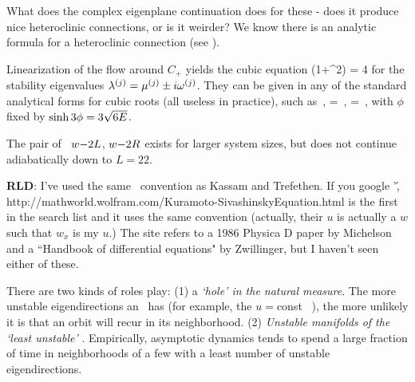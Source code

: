 {What does the complex eigenplane continuation does for these
{\eqva} - does it produce nice heteroclinic connections, or is it
weirder? We know there is an analytic formula for a heteroclinic
connection (see ). %

Linearization of the flow around $C_{+}$ yields the cubic equation
  \beq
\eigExp(1+\eigExp^2) = 4 \expctE
for the
stability eigenvalues
$\eigExp[j] = \eigRe[j] \pm i \eigIm[j]$.
They can
be given in any of the standard analytical forms for cubic
roots  (all useless in practice), such as
    \,,\qquad
\eigRe=\sinh \phi
\,,\qquad
\eigIm=\cosh \phi \, ,
with $\phi$ fixed by $\sinh 3\phi=3\sqrt{6E}$.

The pair of \reqva\
${w-}2L$,
${w-}2R$
exists for larger system sizes, but does not continue
adiabatically down to $L=22$.



{\bf RLD}:
I've used the same \KSe\ convention as Kassam and Trefethen.
If you google '\KS\',
http://mathworld.wolfram.com/Kuramoto-SivashinskyEquation.html is
the first in the search list and it uses the same convention
(actually, their $u$ is actually a $w$ such that $w_x$ is my $u$.)
The site refers to a 1986 Physica D paper by Michelson and a
``Handbook of differential equations" by Zwillinger, but I haven't
seen either of these.

%
There are two kinds of roles
{\eqva} play:
(1)
a {\em `hole' in the natural measure}.
The more unstable eigendirections an \eqv\ has (for example, the
$u=$const \eqv~\EQV{0}), the more unlikely it is  that
an orbit will recur in its neighborhood.
(2)
{\em Unstable manifolds of the `least unstable' {\eqva}}.
Empirically, asymptotic dynamics tends to spend
a large fraction of time in
neighborhoods of a few  {\eqva} with
a least number of unstable eigendirections.




}
